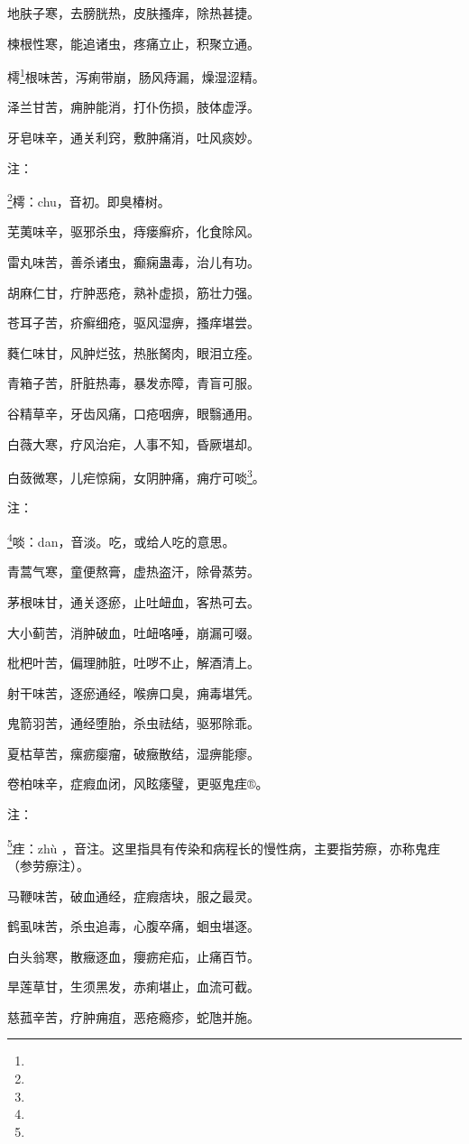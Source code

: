 \documentclass[a4paper,12pt,UTF8,twoside]{ctexbook}
\begin{document}
地肤子寒，去膀胱热，皮肤搔痒，除热甚捷。

楝根性寒，能追诸虫，疼痛立止，积聚立通。

樗\footnote{}根味苦，泻痢带崩，肠风痔漏，燥湿涩精。

泽兰甘苦，痈肿能消，打仆伤损，肢体虚浮。

牙皂味辛，通关利窍，敷肿痛消，吐风痰妙。

注：

\footnote{}樗：chu，音初。即臭椿树。

芜荑味辛，驱邪杀虫，痔瘘癣疥，化食除风。

雷丸味苦，善杀诸虫，癫痫蛊毒，治儿有功。

胡麻仁甘，疔肿恶疮，熟补虚损，筋壮力强。

苍耳子苦，疥癣细疮，驱风湿痹，搔痒堪尝。

蕤仁味甘，风肿烂弦，热胀胬肉，眼泪立痊。

青箱子苦，肝脏热毒，暴发赤障，青盲可服。

谷精草辛，牙齿风痛，口疮咽痹，眼翳通用。

白薇大寒，疗风治疟，人事不知，昏厥堪却。

白蔹微寒，儿疟惊痫，女阴肿痛，痈疔可啖\footnote{}。

注：

\footnote{}啖：dan，音淡。吃，或给人吃的意思。

青蒿气寒，童便熬膏，虚热盗汗，除骨蒸劳。

茅根味甘，通关逐瘀，止吐衄血，客热可去。

大小蓟苦，消肿破血，吐衄咯唾，崩漏可啜。

枇杷叶苦，偏理肺脏，吐哕不止，解酒清上。

射干味苦，逐瘀通经，喉痹口臭，痈毒堪凭。

鬼箭羽苦，通经堕胎，杀虫祛结，驱邪除乖。

夏枯草苦，瘰疬瘿瘤，破癥散结，湿痹能瘳。

卷柏味辛，症瘕血闭，风眩痿璧，更驱鬼疰®。

注：

\footnote{}疰：zhù ，音注。这里指具有传染和病程长的慢性病，主要指劳瘵，亦称鬼疰（参劳瘵注）。

马鞭味苦，破血通经，症瘕痞块，服之最灵。

鹤虱味苦，杀虫追毒，心腹卒痛，蛔虫堪逐。

白头翁寒，散癥逐血，癭疬疟疝，止痛百节。

旱莲草甘，生须黑发，赤痢堪止，血流可截。

慈菰辛苦，疗肿痈疽，恶疮瘾疹，蛇虺并施。
\end{document}
